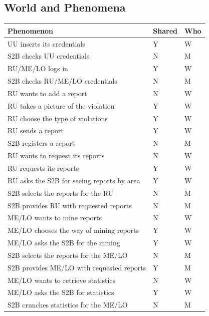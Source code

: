 			\subsection{World and Phenomena}
				\begin{table}[!h]
					\begin{center}
						\begin{tabular}{L{0.73\textwidth}P{0.1\textwidth}P{0.059\textwidth}}
							\toprule
								Phenomenon & Shared & Who \\
							\midrule
								UU inserts its credentials & Y & W \\[1mm]
								S2B checks UU credentials & N & M \\[1mm]
								RU/ME/LO logs in & Y & W \\[1mm]
								S2B checks RU/ME/LO credentials & N & M \\[1mm]
								RU wants to add a report & N & W \\[1mm]
								RU takes a picture of the violation & Y & W \\[1mm]
								RU choose the type of violations & Y & W \\[1mm]
								RU sends a report & Y & W \\[1mm]								S2B registers a report & N & M \\[1mm]
								RU wants to request its reports & N & W \\[1mm]
								RU requests its reports & Y & W \\[1mm]
								RU asks the S2B for seeing reports by area & Y & W \\[1mm]
								S2B selects the reports for the RU & N & M \\[1mm]
								S2B provides RU with requested reports & N & M \\[1mm]
								ME/LO wants to mine reports & N  & W \\[1mm]
								ME/LO chooses the way of mining reports & Y & W \\[1mm]
								ME/LO asks the S2B for the mining & Y & W \\[1mm]
								S2B selects the reports for the ME/LO & N & M \\[1mm]
								S2B provides ME/LO with requested reports & Y & M \\[1mm]			
								ME/LO wants to retrieve statistics & N & W \\[1mm]
								ME/LO asks the S2B for statistics & Y & W \\[1mm]
								S2B crunches statistics for the ME/LO & N & M \\[1mm]

\end{tabular}
\end{center}
\end{table}
